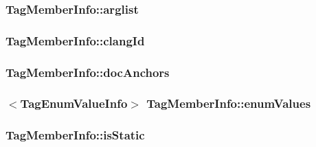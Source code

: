 \subsubsection[{arglist}]{ Tag\+Member\+Info\+::arglist}\label{class_tag_member_info_a46577a5da57e5dd5d98f85fb38765656}
\hypertarget{class_tag_member_info_a1f0b01f7cf9f3880c54453d3b6e21260}{}
\subsubsection[{clang\+Id}]{ Tag\+Member\+Info\+::clang\+Id}\label{class_tag_member_info_a1f0b01f7cf9f3880c54453d3b6e21260}
\hypertarget{class_tag_member_info_a067f88b36230ce24655b30bfab86a39e}{}
\subsubsection[{doc\+Anchors}]{ Tag\+Member\+Info\+::doc\+Anchors}\label{class_tag_member_info_a067f88b36230ce24655b30bfab86a39e}
\hypertarget{class_tag_member_info_a406e0ceb98d5141ae5f8106d6d728cf9}{}
\subsubsection[{enum\+Values}]{$<${\bf Tag\+Enum\+Value\+Info}$>$ Tag\+Member\+Info\+::enum\+Values}\label{class_tag_member_info_a406e0ceb98d5141ae5f8106d6d728cf9}
\hypertarget{class_tag_member_info_a773b80f18d20211980b63dc1defbcf6d}{}
\subsubsection[{is\+Static}]{ Tag\+Member\+Info\+::is\+Static}\label{class_tag_member_info_a773b80f18d20211980b63dc1defbcf6d}
\hypertarget{class_tag_member_info_aa4c0dd35f21b4e6a8a2fdbb21ae188a2}{}
